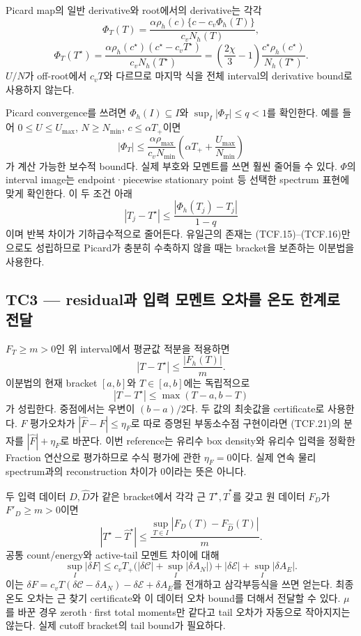 Picard map의 일반 derivative와 root에서의 derivative는 각각 \[
\Phi_T(T)=
\frac{\alpha\rho_h(c)\{c-c_v\Phi_h(T)\}}{c_vN_h(T)},
\] \[
\Phi_T(T^\star)=
\frac{\alpha\rho_h(c^\star)(c^\star-c_vT^\star)}
{c_vN_h(T^\star)}
=\left(\frac{2\chi}{3}-1\right)
 \frac{c^\star\rho_h(c^\star)}{N_h(T^\star)} .
\tag{TCF.18}
\] \(U/N\)가 off-root에서 \(c_vT\)와 다르므로 마지막 식을 전체 interval의 derivative bound로 사용하지 않는다.

Picard convergence를 쓰려면 \(\Phi_h(I)\subseteq I\)와 \(\sup_I|\Phi_T|\le q<1\)를 확인한다. 예를 들어 \(0\le U\le U_{\max}\), \(N\ge N_{\min}\), \(c\le\alpha T_+\)이면 \[
|\Phi_T|\le
\frac{\alpha\rho_{\max}}{c_vN_{\min}}
\left(\alpha T_++\frac{U_{\max}}{N_{\min}}\right)
\tag{TCF.19}
\] 가 계산 가능한 보수적 bound다. 실제 부호와 모멘트를 쓰면 훨씬 줄어들 수 있다. \(\Phi\)의 interval image는 endpoint·piecewise stationary point 등 선택한 spectrum 표현에 맞게 확인한다. 이 두 조건 아래 \[
|T_j-T^\star|\le\frac{|\Phi_h(T_j)-T_j|}{1-q}
\tag{TCF.20}
\] 이며 반복 차이가 기하급수적으로 줄어든다. 유일근의 존재는 (TCF.15)--(TCF.16)만으로도 성립하므로 Picard가 충분히 수축하지 않을 때는 bracket을 보존하는 이분법을 사용한다.

\hypertarget{tc3-residualuxacfc-uxc785uxb825-uxbaa8uxba58uxd2b8-uxc624uxcc28uxb97c-uxc628uxb3c4-uxd55cuxacc4uxb85c-uxc804uxb2ec}{%
\subsection{TC3 --- residual과 입력 모멘트 오차를 온도 한계로 전달}\label{tc3-residualuxacfc-uxc785uxb825-uxbaa8uxba58uxd2b8-uxc624uxcc28uxb97c-uxc628uxb3c4-uxd55cuxacc4uxb85c-uxc804uxb2ec}}

\(F_T\ge m>0\)인 위 interval에서 평균값 적분을 적용하면 \[
\boxed{\quad |T-T^\star|\le \frac{|F_h(T)|}{m}.\quad}
\tag{TCF.21}
\] 이분법의 현재 bracket \([a,b]\)와 \(T\in[a,b]\)에는 독립적으로 \[
|T-T^\star|\le\max(T-a,b-T)
\tag{TCF.22}
\] 가 성립한다. 중점에서는 우변이 \((b-a)/2\)다. 두 값의 최솟값을 certificate로 사용한다. \(F\) 평가오차가 \(|\widehat F-F|\le\eta_F\)로 따로 증명된 부동소수점 구현이라면 (TCF.21)의 분자를 \(|\widehat F|+\eta_F\)로 바꾼다. 이번 reference는 유리수 box density와 유리수 입력을 정확한 Fraction 연산으로 평가하므로 수식 평가에 관한 \(\eta_F=0\)이다. 실제 연속 물리 spectrum과의 reconstruction 차이가 0이라는 뜻은 아니다.

두 입력 데이터 \(D,\widehat D\)가 같은 bracket에서 각각 근 \(T^\star,\widehat T^\star\)를 갖고 원 데이터 \(F_D\)가 \(F'_D\ge m>0\)이면 \[
|T^\star-\widehat T^\star|
\le\frac{\sup_{T\in I}|F_D(T)-F_{\widehat D}(T)|}{m}.
\tag{TCF.23}
\] 공통 count/energy와 active-tail 모멘트 차이에 대해 \[
\sup_I|\delta F|
\le c_vT_+\bigl(|\delta\mathscr C|+\sup_I|\delta A_N|\bigr)
+|\delta\mathscr E|+\sup_I|\delta A_E|.
\tag{TCF.24}
\] 이는 \(\delta F=c_vT(\delta\mathscr C-\delta A_N)-\delta\mathscr E+\delta A_E\)를 전개하고 삼각부등식을 쓰면 얻는다. 최종 온도 오차는 근 찾기 certificate와 이 데이터 오차 bound를 더해서 전달할 수 있다. \(\mu\)를 바꾼 경우 zeroth·first total moments만 같다고 tail 오차가 자동으로 작아지지는 않는다. 실제 cutoff bracket의 tail bound가 필요하다.

